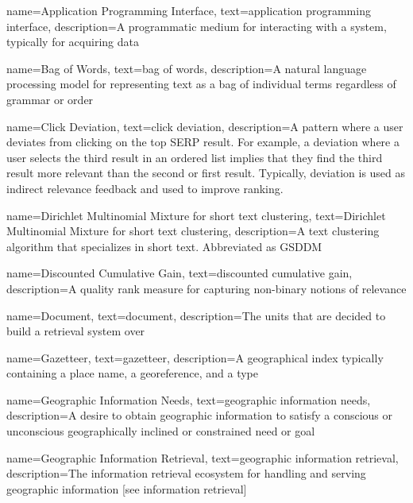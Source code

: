 
{
    name=Application Programming Interface,
    text=application programming interface,
    description={A programmatic medium for interacting with a system, typically for acquiring data}
}


{
    name=Bag of Words,
    text=bag of words,
    description=A natural language processing model for representing text as a bag of individual terms regardless of grammar or order
}

{
    name=Click Deviation,
    text=click deviation,
    description={A pattern where a user deviates from clicking on the top SERP result. For example, a deviation where a user selects the third result in an ordered list implies that they find the third result more relevant than the second or first result. Typically, deviation is used as indirect relevance feedback and used to improve ranking.}
}

{
    name=Dirichlet Multinomial Mixture for short text clustering,
    text=Dirichlet Multinomial Mixture for short text clustering,
    description={A text clustering algorithm that specializes in short text. Abbreviated as GSDDM}
}

{
    name=Discounted Cumulative Gain,
    text=discounted cumulative gain,
    description=A quality rank measure for capturing non-binary notions of relevance
}

{
    name=Document,
    text=document,
    description=The units that are decided to build a retrieval system over \cite{Manning2008}
}

{
    name=Gazetteer,
    text=gazetteer,
    description={A geographical index typically containing a place name, a georeference, and a type}
}

{
    name=Geographic Information Needs,
    text=geographic information needs,
    description=A desire to obtain geographic information to satisfy a conscious or unconscious geographically inclined or constrained need or goal
}

{
    name=Geographic Information Retrieval,
    text=geographic information retrieval,
    description=The information retrieval ecosystem for handling and serving geographic information [see information retrieval]
}

